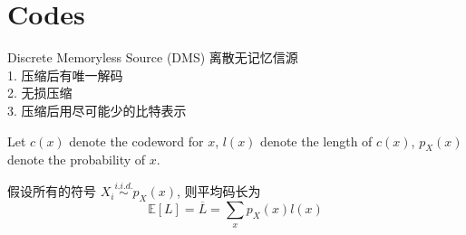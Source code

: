 \section{Codes}

\begin{definition}
Discrete Memoryless Source (DMS) 离散无记忆信源 \\
1. 压缩后有唯一解码 \\
2. 无损压缩 \\
3. 压缩后用尽可能少的比特表示
\end{definition}

Let $c(x)$ denote the codeword for $x$, $l(x)$ denote the length of $c(x)$, $p_X(x)$ denote the probability of $x$.

假设所有的符号 $X_i\stackrel{i.i.d.}{\sim}p_X(x)$, 则平均码长为
$$\mathbb{E}[L]=\overline{L}=\sum_{x}p_X(x)l(x)$$

